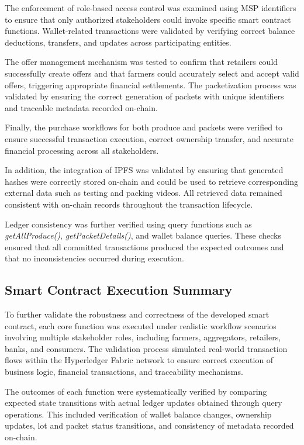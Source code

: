 \documentclass[12pt]{article}
\begin{document}
	The enforcement of role-based access control was examined using MSP identifiers to ensure that only authorized stakeholders could invoke specific smart contract functions. Wallet-related transactions were validated by verifying correct balance deductions, transfers, and updates across participating entities.
	
	The offer management mechanism was tested to confirm that retailers could successfully create offers and that farmers could accurately select and accept valid offers, triggering appropriate financial settlements. The packetization process was validated by ensuring the correct generation of packets with unique identifiers and traceable metadata recorded on-chain.
	
	Finally, the purchase workflows for both produce and packets were verified to ensure successful transaction execution, correct ownership transfer, and accurate financial processing across all stakeholders.
	
	
	In addition, the integration of IPFS was validated by ensuring that generated hashes were correctly stored on-chain and could be used to retrieve corresponding external data such as testing and packing videos. All retrieved data remained consistent with on-chain records throughout the transaction lifecycle.
	
	Ledger consistency was further verified using query functions such as \textit{getAllProduce()}, \textit{getPacketDetails()}, and wallet balance queries. These checks ensured that all committed transactions produced the expected outcomes and that no inconsistencies occurred during execution.
	
	\subsection{Smart Contract Execution Summary}
	
	To further validate the robustness and correctness of the developed smart contract, each core function was executed under realistic workflow scenarios involving multiple stakeholder roles, including farmers, aggregators, retailers, banks, and consumers. The validation process simulated real-world transaction flows within the Hyperledger Fabric network to ensure correct execution of business logic, financial transactions, and traceability mechanisms.
	
	The outcomes of each function were systematically verified by comparing expected state transitions with actual ledger updates obtained through query operations. This included verification of wallet balance changes, ownership updates, lot and packet status transitions, and consistency of metadata recorded on-chain.
	
\end{document}

